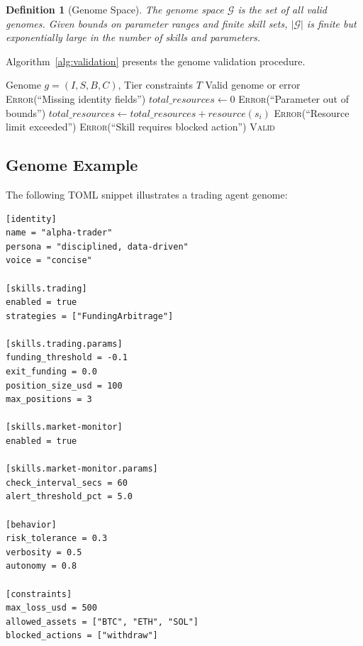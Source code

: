 \documentclass{article}
\newtheorem{definition}{Definition}
\newcommand{\genomespace}{\mathcal{G}}
\begin{document}
\begin{definition}[Genome Space]
The genome space $\genomespace$ is the set of all valid genomes. Given bounds on parameter ranges and finite skill sets, $|\genomespace|$ is finite but exponentially large in the number of skills and parameters.
\end{definition}

Algorithm~\ref{alg:validation} presents the genome validation procedure.

\begin{algorithm}[t]
\caption{Genome Validation}
\label{alg:validation}
\begin{algorithmic}[1]
\Require Genome $g = (I, S, B, C)$, Tier constraints $T$
\Ensure Valid genome or error
        \State \Return \textsc{Error}(``Missing identity fields'')
    \EndIf
    \State $total\_resources \gets 0$
                    \State \Return \textsc{Error}(``Parameter out of bounds'')
                \EndIf
            \EndFor
            \State $total\_resources \gets total\_resources + resource(s_i)$
        \EndIf
    \EndFor
        \State \Return \textsc{Error}(``Resource limit exceeded'')
    \EndIf
        \State \Return \textsc{Error}(``Skill requires blocked action'')
    \EndIf
    \State \Return \textsc{Valid}
\EndFunction
\end{algorithmic}
\end{algorithm}

\subsection{Genome Example}

The following TOML snippet illustrates a trading agent genome:

\begin{lstlisting}[style=tomlcode, caption={Example genome for a trading agent}]
[identity]
name = "alpha-trader"
persona = "disciplined, data-driven"
voice = "concise"

[skills.trading]
enabled = true
strategies = ["FundingArbitrage"]

[skills.trading.params]
funding_threshold = -0.1
exit_funding = 0.0
position_size_usd = 100
max_positions = 3

[skills.market-monitor]
enabled = true

[skills.market-monitor.params]
check_interval_secs = 60
alert_threshold_pct = 5.0

[behavior]
risk_tolerance = 0.3
verbosity = 0.5
autonomy = 0.8

[constraints]
max_loss_usd = 500
allowed_assets = ["BTC", "ETH", "SOL"]
blocked_actions = ["withdraw"]
\end{lstlisting}
\end{document}
